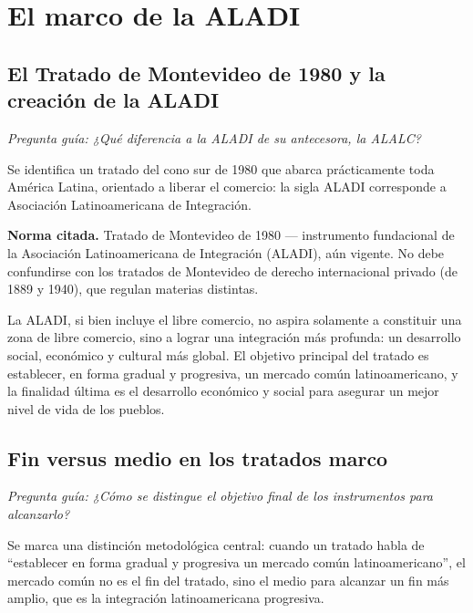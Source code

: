 \documentclass[12pt,oneside]{book}
\begin{document}
\chapter{El marco de la ALADI}

\section{El Tratado de Montevideo de 1980 y la creación de la ALADI}

\textit{Pregunta guía: ¿Qué diferencia a la ALADI de su antecesora, la ALALC?}

Se identifica un tratado del cono sur de 1980 que abarca prácticamente toda América Latina, orientado a liberar el comercio: la sigla ALADI corresponde a Asociación Latinoamericana de Integración.

\begin{important}
\textbf{Norma citada.} Tratado de Montevideo de 1980 — instrumento fundacional de la Asociación Latinoamericana de Integración (ALADI), aún vigente. No debe confundirse con los tratados de Montevideo de derecho internacional privado (de 1889 y 1940), que regulan materias distintas.
\end{important}

La ALADI, si bien incluye el libre comercio, no aspira solamente a constituir una zona de libre comercio, sino a lograr una integración más profunda: un desarrollo social, económico y cultural más global. El objetivo principal del tratado es establecer, en forma gradual y progresiva, un mercado común latinoamericano, y la finalidad última es el desarrollo económico y social para asegurar un mejor nivel de vida de los pueblos.

\section{Fin versus medio en los tratados marco}

\textit{Pregunta guía: ¿Cómo se distingue el objetivo final de los instrumentos para alcanzarlo?}

Se marca una distinción metodológica central: cuando un tratado habla de ``establecer en forma gradual y progresiva un mercado común latinoamericano'', el mercado común no es el fin del tratado, sino el medio para alcanzar un fin más amplio, que es la integración latinoamericana progresiva.
\end{document}
